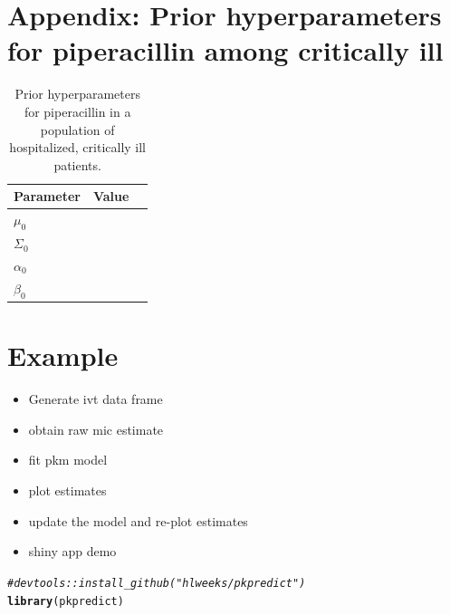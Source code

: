 \documentclass{article}\usepackage[]{graphicx}\usepackage[]{color}
\makeatletter
\newcommand{\hlcom}[1]{\textcolor[rgb]{0.678,0.584,0.686}{\textit{#1}}}%
\newcommand{\hlstd}[1]{\textcolor[rgb]{0.345,0.345,0.345}{#1}}%
\newcommand{\hlkwd}[1]{\textcolor[rgb]{0.737,0.353,0.396}{\textbf{#1}}}%
\newenvironment{kframe}{%
 \def\at@end@of@kframe{}%
 \ifinner\ifhmode%
  \def\at@end@of@kframe{\end{minipage}}%
  \begin{minipage}{\columnwidth}%
 \fi\fi%
 \def\FrameCommand##1{\hskip\@totalleftmargin \hskip-\fboxsep
 \colorbox{shadecolor}{##1}\hskip-\fboxsep
     \hskip-\linewidth \hskip-\@totalleftmargin \hskip\columnwidth}%
 \MakeFramed {\advance\hsize-\width
   \@totalleftmargin\z@ \linewidth\hsize
   \@setminipage}}%
 {\par\unskip\endMakeFramed%
 \at@end@of@kframe}
\newenvironment{knitrout}{}{} %
\makeatother
\begin{document}
\section{Appendix: Prior hyperparameters for piperacillin among critically ill}
\begin{center}
\begin{table}
\begin{tabular}{lll} \hline
Parameter & Value \\ \hline
$\mu_0$ & \\
$\Sigma_0$ & \\
$\alpha_0$ & \\
$\beta_0$  & \\
\hline
\end{tabular}
\caption{Prior hyperparameters for piperacillin in a population of hospitalized, critically ill patients.}\label{tab:hyp}
\end{table}
\end{center}




%



\section{Example}


\begin{itemize}
  \item Generate ivt data frame
  \item obtain raw mic estimate
  \item fit pkm model
  \item plot estimates
  \item update the model and re-plot estimates
  \item shiny app demo
\end{itemize}

\begin{knitrout}
\color{fgcolor}\begin{kframe}
\begin{alltt}
\hlcom{# devtools::install_github("hlweeks/pkpredict")}
\hlkwd{library}\hlstd{(pkpredict)}
\end{alltt}
\end{kframe}
\end{knitrout}
\end{document}
